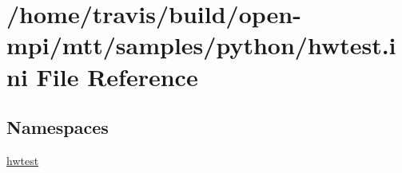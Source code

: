 \hypertarget{hwtest_8ini}{\section{/home/travis/build/open-\/mpi/mtt/samples/python/hwtest.ini File Reference}
\label{hwtest_8ini}
}
\subsection*{Namespaces}
\begin{DoxyCompactItemize}
\item 
\hyperlink{namespacehwtest}{hwtest}
\end{DoxyCompactItemize}
